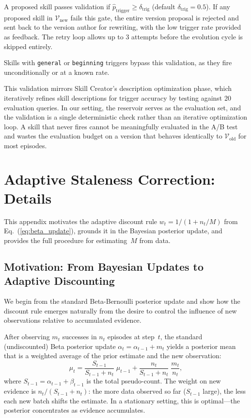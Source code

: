 \documentclass{article}
\theoremstyle{plain}
\theoremstyle{definition}
\theoremstyle{remark}
\begin{document}
A proposed skill passes validation if $\hat{p}_{\text{trigger}} \geq \delta_{\text{trig}}$ (default $\delta_{\text{trig}} = 0.5$). If any proposed skill in $\mathcal{V}_{\text{new}}$ fails this gate, the entire version proposal is rejected and sent back to the version author for rewriting, with the low trigger rate provided as feedback. The retry loop allows up to 3 attempts before the evolution cycle is skipped entirely.

Skills with \texttt{general} or \texttt{beginning} triggers bypass this validation, as they fire unconditionally or at a known rate.

This validation mirrors Skill Creator's description optimization phase, which iteratively refines skill descriptions for trigger accuracy by testing against 20 evaluation queries. In our setting, the reservoir serves as the evaluation set, and the validation is a single deterministic check rather than an iterative optimization loop. A skill that never fires cannot be meaningfully evaluated in the A/B test and wastes the evaluation budget on a version that behaves identically to $\mathcal{V}_{\text{old}}$ for most episodes.

\section{Adaptive Staleness Correction: Details}
\label{app:staleness_details}

This appendix motivates the adaptive discount rule $w_t = 1/(1 + n_t/M)$ from Eq.~(\ref{eq:beta_update}), grounds it in the Bayesian posterior update, and provides the full procedure for estimating~$M$ from data.

\subsection{Motivation: From Bayesian Updates to Adaptive Discounting}

We begin from the standard Beta-Bernoulli posterior update and show how the discount rule emerges naturally from the desire to control the influence of new observations relative to accumulated evidence.

After observing $m_t$ successes in $n_t$ episodes at step~$t$, the standard (undiscounted) Beta posterior update $\alpha_t = \alpha_{t-1} + m_t$ yields a posterior mean that is a weighted average of the prior estimate and the new observation:
\begin{equation}
    \mu_t = \frac{S_{t-1}}{S_{t-1} + n_t}\;\mu_{t-1} + \frac{n_t}{S_{t-1} + n_t}\;\frac{m_t}{n_t},
    \label{eq:standard_update}
\end{equation}
where $S_{t-1} = \alpha_{t-1} + \beta_{t-1}$ is the total pseudo-count. The weight on new evidence is $n_t/(S_{t-1} + n_t)$: the more data observed so far ($S_{t-1}$ large), the less each new batch shifts the estimate. In a stationary setting, this is optimal---the posterior concentrates as evidence accumulates.
\end{document}
